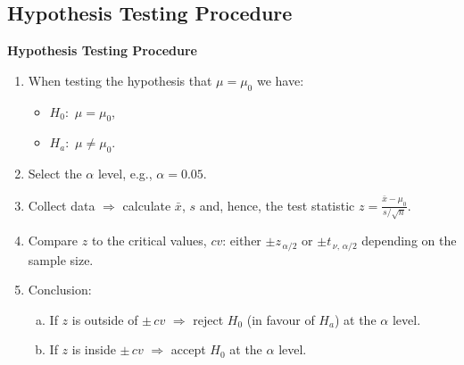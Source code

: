 \documentclass[compress]{beamer}        %
\makeatletter
\newcommand{\tcb}{\textcolor{beamer@blendedblue}}
\makeatother
\begin{document}
\subsection{Hypothesis Testing Procedure}
\begin{frame}{\bf \tcb{Hypothesis Testing Procedure}}

\begin{enumerate}[1.]\itemsep0.4cm
\item When testing the hypothesis that $\mu = \mu_0$ we have:\\
    \begin{itemize}\itemsep0.3cm
    \item $H_0:$ $\mu = \mu_0$,
    \item $H_a:$ $\mu \ne \mu_0$.
    \end{itemize}
\item Select the $\alpha$ level, e.g., $\alpha = 0.05$.
\item Collect data $\Rightarrow$ calculate $\bar x$, $s$ and, hence, the test statistic $z = \frac{\bar x -\mu_0}{s / \sqrt{n}}$.
\item Compare $z$ to the critical values, $cv$: either $\pm z_{\,\alpha/2}$ or $\pm t_{\,\nu,\,\alpha/2}$ depending on the sample size.
\item Conclusion:\\
    \begin{enumerate}[a)]\itemsep0.3cm
    \item If $z$ is outside of $\pm\,cv$ $\Rightarrow$ reject $H_0$ (in favour of $H_a$) at the $\alpha$ level.
    \item If $z$ is inside $\pm\,cv$ $\Rightarrow$ accept $H_0$ at the $\alpha$ level.
    \end{enumerate}
\end{enumerate}

\end{frame}
\end{document}

